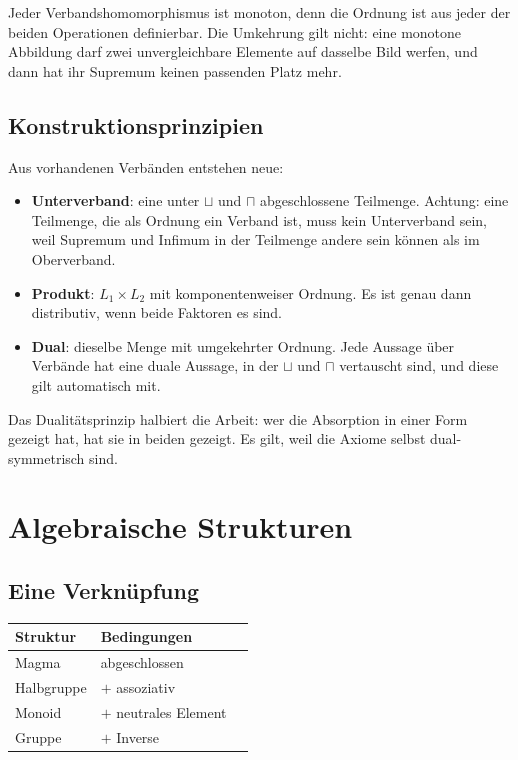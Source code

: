 \documentclass[12pt, a4paper]{article}
\begin{document}
Jeder Verbandshomomorphismus ist monoton, denn die Ordnung ist aus jeder der
beiden Operationen definierbar. Die Umkehrung gilt nicht: eine monotone
Abbildung darf zwei unvergleichbare Elemente auf dasselbe Bild werfen, und
dann hat ihr Supremum keinen passenden Platz mehr.

\subsection{Konstruktionsprinzipien}

Aus vorhandenen Verbänden entstehen neue:
\begin{itemize}
  \item \textbf{Unterverband}: eine unter $\sqcup$ und $\sqcap$
        abgeschlossene Teilmenge. Achtung: eine Teilmenge, die als Ordnung
        ein Verband ist, muss kein Unterverband sein, weil Supremum und
        Infimum in der Teilmenge andere sein können als im Oberverband.
  \item \textbf{Produkt}: $L_1 \times L_2$ mit komponentenweiser Ordnung.
        Es ist genau dann distributiv, wenn beide Faktoren es sind.
  \item \textbf{Dual}: dieselbe Menge mit umgekehrter Ordnung. Jede Aussage
        über Verbände hat eine duale Aussage, in der $\sqcup$ und $\sqcap$
        vertauscht sind, und diese gilt automatisch mit.
\end{itemize}

\begin{notebox}
Das Dualitätsprinzip halbiert die Arbeit: wer die Absorption in einer Form
gezeigt hat, hat sie in beiden gezeigt. Es gilt, weil die Axiome selbst
dual-symmetrisch sind.
\end{notebox}

\section{Algebraische Strukturen}

\subsection{Eine Verknüpfung}

\begin{center}
\begin{tabular}{lll}
\toprule
Struktur & Bedingungen\\
\midrule
Magma & abgeschlossen\\
Halbgruppe & $+$ assoziativ\\
Monoid & $+$ neutrales Element\\
Gruppe & $+$ Inverse\\
\bottomrule
\end{tabular}
\end{center}
\end{document}
